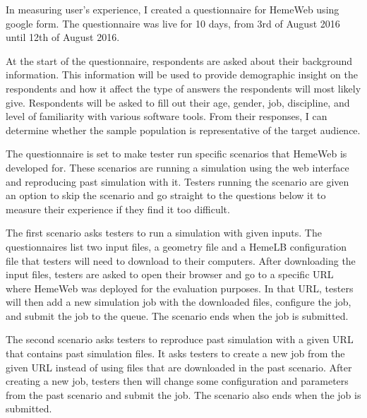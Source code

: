 In measuring user's experience, I created a questionnaire for HemeWeb using google form. The questionnaire was live for 10 days, from 3rd of August 2016 until 12th of August 2016.


At the start of the questionnaire, respondents are asked about their background information. This information will be used to provide demographic insight on the respondents and how it affect the type of answers the respondents will most likely give. Respondents will be asked to fill out their age, gender, job, discipline, and level of familiarity with various software tools. From their responses, I can determine whether the sample population is representative of the target audience.


The questionnaire is set to make tester run specific scenarios that HemeWeb is developed for. These scenarios are running a simulation using the web interface and reproducing past simulation with it. Testers running the scenario are given an option to skip the scenario and go straight to the questions below it to measure their experience if they find it too difficult. 

The first scenario asks testers to run a simulation with given inputs. The questionnaires list two input files, a geometry file and a HemeLB configuration file that testers will need to download to their computers. After downloading the input files, testers are asked to open their browser and go to a specific URL where HemeWeb was deployed for the evaluation purposes. In that URL, testers will then add a new simulation job with the downloaded files, configure the job, and submit the job to the queue. The scenario ends when the job is submitted.

The second scenario asks testers to reproduce past simulation with a given URL that contains past simulation files. It asks testers to create a new job from the given URL instead of using files that are downloaded in the past scenario. After creating a new job, testers then will change some configuration and parameters from the past scenario and submit the job. The scenario also ends when the job is submitted.

